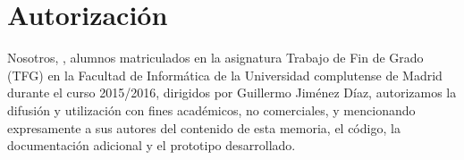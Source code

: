 %
%
%
%
%

\chapter{Autorización}

Nosotros, \autor, alumnos matriculados en la asignatura Trabajo de Fin de Grado (TFG) en la Facultad de Informática de la Universidad complutense de Madrid durante el curso 2015/2016, dirigidos por Guillermo Jiménez Díaz, autorizamos la difusión y utilización con fines académicos, no comerciales, y mencionando expresamente a sus autores del contenido de esta memoria, el código, la documentación adicional y el prototipo desarrollado.

\textbf{\autor}

\endinput
